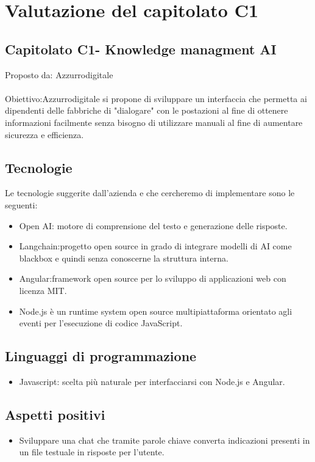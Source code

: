 \documentclass{article}
\begin{document}
\section{Valutazione del capitolato C1}
\subsection{Capitolato C1- Knowledge managment AI}
Proposto da: Azzurrodigitale\\ \\
Obiettivo:Azzurrodigitale si propone di sviluppare un interfaccia che permetta ai dipendenti delle fabbriche di "dialogare" con le postazioni al fine di ottenere informazioni facilmente senza bisogno di utilizzare manuali al fine di aumentare sicurezza e efficienza.
\subsection{Tecnologie}
Le tecnologie suggerite dall’azienda e che cercheremo di implementare sono le seguenti:
\begin{itemize}
    \item Open AI: motore di comprensione del testo e generazione delle risposte.
    \item Langchain:progetto open source in grado di integrare modelli di AI come blackbox e quindi senza conoscerne la struttura interna.
    \item Angular:framework open source per lo sviluppo di applicazioni web con licenza MIT.
    \item Node.js è un runtime system open source multipiattaforma orientato agli eventi per l'esecuzione di codice JavaScript.
\end{itemize}
\subsection{Linguaggi di programmazione}
\begin{itemize}
    \item Javascript: scelta più naturale per interfacciarsi con Node.js e Angular.
\end{itemize}
\subsection{Aspetti positivi}
\begin{itemize}
    \item Sviluppare una chat che tramite parole chiave converta indicazioni presenti in un file testuale in risposte per l'utente.
\end{itemize}
\end{document}

